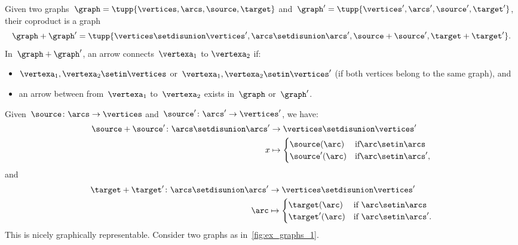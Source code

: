 \begin{example}
    \label{def:ex_graph}
    Given two graphs~$\graph=\tupp{\vertices,\arcs,\source,\target}$ and~$\graph'=\tupp{\vertices',\arcs',\source',\target'}$, their coproduct is a graph
    \begin{equation}
        \graph+\graph'=\tupp{\vertices \setdisunion\vertices',\arcs \setdisunion\arcs',\source+\source',\target+\target'}.
    \end{equation}
    In~$\graph+\graph'$, an arrow connects~$\vertexa_1$ to $\vertexa_2$ if:
    \begin{itemize}
        \item $\vertexa_1,\vertexa_2\setin \vertices$ or~$\vertexa_1,\vertexa_2\setin \vertices'$ (if both vertices belong to the same graph), and
        \item an arrow between from~$\vertexa_1$ to~$\vertexa_2$ exists in~$\graph$ or~$\graph'$.
    \end{itemize}
    Given~$\source \colon \arcs \to \vertices$ and~$\source'\colon \arcs'\to \vertices'$, we have:
    \begin{equation}
        \begin{aligned}
            \source +\source'\colon \arcs\setdisunion \arcs' & \to \vertices \setdisunion \vertices' \\
            x                                                & \mapsto
            \begin{cases}
                \source(\arc)  & \text{if} \arc\setin \arcs   \\
                \source'(\arc) & \text{if} \arc\setin \arcs',
            \end{cases}
        \end{aligned}
    \end{equation}
    and
    \begin{equation}
        \begin{aligned}
            \target +\target '\colon \arcs\setdisunion \arcs ' & \to \vertices\setdisunion \vertices' \\
            \arc                                               & \mapsto
            \begin{cases}
                \target(\arc)  & \text{if } \arc\setin \arcs   \\
                \target'(\arc) & \text{if } \arc\setin \arcs'.
            \end{cases}
        \end{aligned}
    \end{equation}
    This is nicely graphically representable.
    Consider two graphs as in~\cref{fig:ex_graphs_1}.


\end{example}
